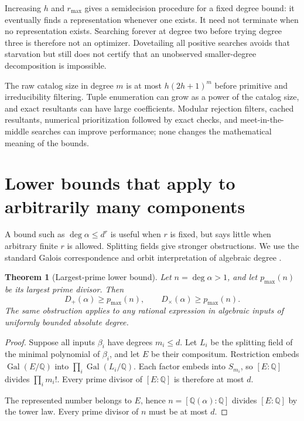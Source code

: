 \documentclass[11pt,a4paper]{article}
\newcommand{\Q}{\mathbb Q}
\newcommand{\Gal}{\operatorname{Gal}}
\newcommand{\dplus}{D_{+}}
\newcommand{\dtimes}{D_{\times}}
\newtheorem{theorem}{Theorem}[section]
\theoremstyle{definition}
\theoremstyle{remark}
\begin{document}
Increasing $h$ and $r_{\max}$ gives a semidecision procedure for a fixed degree bound: it eventually finds a representation whenever one exists. It need not terminate when no representation exists. Searching forever at degree two before trying degree three is therefore not an optimizer. Dovetailing all positive searches avoids that starvation but still does not certify that an unobserved smaller-degree decomposition is impossible.

The raw catalog size in degree $m$ is at most $h(2h+1)^m$ before primitive and irreducibility filtering. Tuple enumeration can grow as a power of the catalog size, and exact resultants can have large coefficients. Modular rejection filters, cached resultants, numerical prioritization followed by exact checks, and meet-in-the-middle searches can improve performance; none changes the mathematical meaning of the bounds.

\section{Lower bounds that apply to arbitrarily many components}
\label{sec:lower}
A bound such as $\deg\alpha\leq d^r$ is useful when $r$ is fixed, but says little when arbitrary finite $r$ is allowed. Splitting fields give stronger obstructions. We use the standard Galois correspondence and orbit interpretation of algebraic degree \cite{milne}.

\begin{theorem}[Largest-prime lower bound]
\label{thm:primebound}
Let $n=\deg\alpha>1$, and let $p_{\max}(n)$ be its largest prime divisor. Then
\[
 \dplus(\alpha)\geq p_{\max}(n),\qquad
 \dtimes(\alpha)\geq p_{\max}(n).
\]
The same obstruction applies to any rational expression in algebraic inputs of uniformly bounded absolute degree.
\end{theorem}
\begin{proof}
Suppose all inputs $\beta_i$ have degrees $m_i\leq d$. Let $L_i$ be the splitting field of the minimal polynomial of $\beta_i$, and let $E$ be their compositum. Restriction embeds $\Gal(E/\Q)$ into $\prod_i\Gal(L_i/\Q)$. Each factor embeds into $S_{m_i}$, so $[E:\Q]$ divides $\prod_i m_i!$. Every prime divisor of $[E:\Q]$ is therefore at most $d$.

The represented number belongs to $E$, hence $n=[\Q(\alpha):\Q]$ divides $[E:\Q]$ by the tower law. Every prime divisor of $n$ must be at most $d$.
\end{proof}
\end{document}
